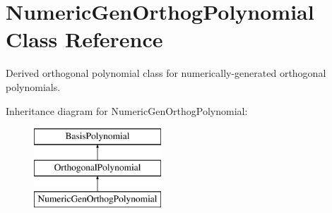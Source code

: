 \section{Numeric\+Gen\+Orthog\+Polynomial Class Reference}
\label{classPecos_1_1NumericGenOrthogPolynomial}


Derived orthogonal polynomial class for numerically-\/generated orthogonal polynomials.  


Inheritance diagram for Numeric\+Gen\+Orthog\+Polynomial\+:\begin{figure}[H]
\begin{center}
\leavevmode
\includegraphics[height=3.000000cm]{classPecos_1_1NumericGenOrthogPolynomial}
\end{center}
\end{figure}
